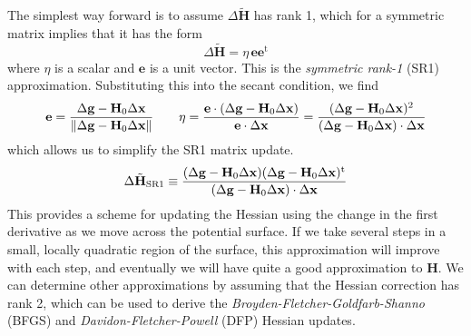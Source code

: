 \documentclass[11pt]{article}
\begin{document}
The simplest way forward is to assume \(\Delta\tilde{\mathbf{H}}\) has rank 1,
which for a symmetric matrix implies that it has the form
\[
    \Delta\tilde{\mathbf{H}}
    =
    \eta\,
    \mathbf{e}
    \mathbf{e}^\mathrm{t}
\]
where \(\eta\) is a scalar and \(\mathbf{e}\) is a unit vector.
This is the {\itshape symmetric rank-1} (SR1) approximation.
Substituting this into the secant condition, we find
\[
    \mathbf{e}
    =
    \frac{%
        \Delta\mathbf{g}
        -
        \mathbf{H}_0
        \Delta\mathbf{x}
    }{%
        \|
        \Delta\mathbf{g}
        -
        \mathbf{H}_0
        \Delta\mathbf{x}
        \|
    }
    \qquad
    \eta
    =
    \frac{%
        \mathbf{e}\cdot
        (
            \Delta\mathbf{g}
            -
            \mathbf{H}_0
            \Delta\mathbf{x}
        )
    }{%
        \mathbf{e}\cdot
        \Delta\mathbf{x}
    }
    =
    \frac{%
        (
            \Delta\mathbf{g}
            -
            \mathbf{H}_0
            \Delta\mathbf{x}
        )^2
    }{%
        (
            \Delta\mathbf{g}
            -
            \mathbf{H}_0
            \Delta\mathbf{x}
        )\cdot
        \Delta\mathbf{x}
    }
\]
which allows us to simplify the SR1 matrix update.
\[
    \Delta\tilde{\mathbf{H}}_{\mathrm{SR1}}
    \equiv
    \frac{%
        (
            \Delta\mathbf{g}
            -
            \mathbf{H}_0
            \Delta\mathbf{x}
        )
        (
            \Delta\mathbf{g}
            -
            \mathbf{H}_0
            \Delta\mathbf{x}
        )^\mathrm{t}
    }{%
        (
            \Delta\mathbf{g}
            -
            \mathbf{H}_0
            \Delta\mathbf{x}
        )\cdot
        \Delta\mathbf{x}
    }
\]
This provides a scheme for updating the Hessian using the change in the first
derivative as we move across the potential surface.
If we take several steps in a small, locally quadratic region of the surface,
this approximation will improve with each step, and eventually we will have
quite a good approximation to \(\mathbf{H}\).
We can determine other approximations by assuming that the Hessian correction
has rank 2, which can be used to derive the {\itshape
Broyden-Fletcher-Goldfarb-Shanno} (BFGS) and {\itshape Davidon-Fletcher-Powell}
(DFP) Hessian updates.
\end{document}
